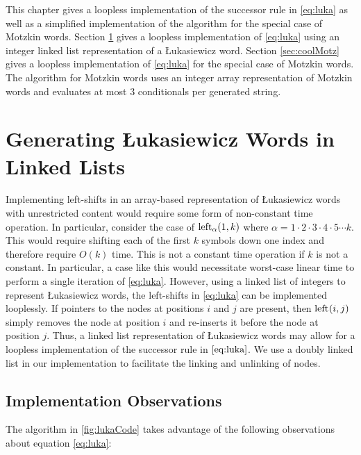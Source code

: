 This chapter gives a loopless implementation of the successor rule in \eqref{eq:luka} as well as a simplified implementation of the algorithm for the special case of Motzkin words. Section \ref{sec:luka_ll} gives a loopless implementation of \eqref{eq:luka} using an integer linked list representation of a Łukasiewicz word. Section \ref{sec:coolMotz} gives a loopless implementation of \eqref{eq:luka} for the special case of Motzkin words.  The algorithm for Motzkin words uses an integer array representation of Motzkin words and evaluates at most 3 conditionals per generated string. 


\section{Generating Łukasiewicz Words in Linked Lists}\label{sec:luka_ll}
Implementing left-shifts in an array-based representation of Łukasiewicz words with unrestricted content would require some form of non-constant time operation.  In particular, consider the case of $\lshiftindex[\alpha]{1}{k}$ where $\alpha=1\cdot2\cdot3\cdot4\cdot5\cdots k$.  This would require shifting each of the first $k$ symbols down one index and therefore require $O(k)$ time.  This is not a constant time operation if $k$ is not a constant.  In particular, a case like this would necessitate worst-case linear time to perform a single iteration of \eqref{eq:luka}.
However, using a linked list of integers to represent Łukasiewicz words, the left-shifts in \eqref{eq:luka} can be implemented looplessly.  If pointers to the nodes at positions $i$ and $j$ are present, then $\lshiftindex{i}{j}$ simply removes the node at position $i$ and re-inserts it before the node at position $j$.  Thus, a linked list representation of Łukasiewicz words may allow for a loopless implementation of the successor rule in $\eqref{eq:luka}$.  We use a doubly linked list in our implementation to facilitate the linking and unlinking of nodes.

\subsection{Implementation Observations}
The algorithm in \ref{fig:lukaCode} takes advantage of the following observations about equation \eqref{eq:luka}:

